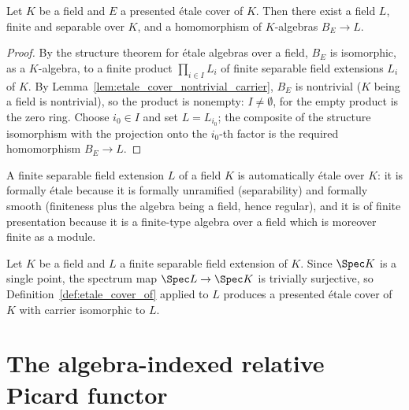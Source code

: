 \begin{theorem}
  \label{thm:etale_cover_field_cofinality}
  \leanok
  Let \(K\) be a field and \(E\) a presented \'etale cover of \(K\). Then there exist a field
  \(L\), finite and separable over \(K\), and a homomorphism of \(K\)-algebras
  \(B_E \to L\).
\end{theorem}
\begin{proof}
  \leanok
  By the structure theorem for \'etale algebras over a field, \(B_E\) is isomorphic, as a
  \(K\)-algebra, to a finite product \(\prod_{i \in I} L_i\) of finite separable field
  extensions \(L_i\) of \(K\). By Lemma~\ref{lem:etale_cover_nontrivial_carrier}, \(B_E\) is
  nontrivial (\(K\) being a field is nontrivial), so the product is nonempty: \(I \neq
  \emptyset\), for the empty product is the zero ring. Choose \(i_0 \in I\) and set
  \(L = L_{i_0}\); the composite of the structure isomorphism with the projection onto the
  \(i_0\)-th factor is the required homomorphism \(B_E \to L\).
\end{proof}

A finite separable field extension \(L\) of a field \(K\) is automatically \'etale over \(K\):
it is formally \'etale because it is formally unramified (separability) and formally smooth
(finiteness plus the algebra being a field, hence regular), and it is of finite presentation
because it is a finite-type algebra over a field which is moreover finite as a module.

\begin{definition}
  \label{def:etale_cover_ofField}
  \leanok
  Let \(K\) be a field and \(L\) a finite separable field extension of \(K\). Since \(\Spec K\)
  is a single point, the spectrum map \(\Spec L \to \Spec K\) is trivially surjective, so
  Definition~\ref{def:etale_cover_of} applied to \(L\) produces a presented \'etale cover of
  \(K\) with carrier isomorphic to \(L\).
\end{definition}

\section{The algebra-indexed relative Picard functor}

